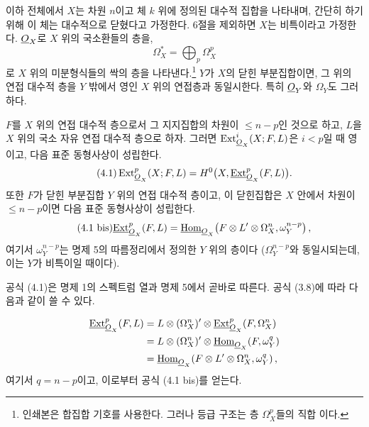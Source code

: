 
이하 전체에서 $X$는 차원 $n$이고 체 $k$ 위에 정의된 대수적 집합을
나타내며, 간단히 하기 위해 이 체는 대수적으로 닫혔다고 가정한다. 6절을
제외하면 $X$는 비특이라고 가정한다. $\underline{O}_X$로 $X$ 위의 국소환들의 층을,
\[
  \Omega_X^{*}=\bigoplus_p\Omega_X^{p}
\]
로 $X$ 위의 미분형식들의 싹의 층을 나타낸다.\footnote{인쇄본은
합집합 기호를 사용한다. 그러나 등급 구조는 층 $\Omega_X^p$들의 직합
이다.} $Y$가 $X$의 닫힌 부분집합이면, 그 위의 연접 대수적 층을
$Y$ 밖에서 영인 $X$ 위의 연접층과 동일시한다. 특히 $\underline{O}_Y$와
$\Omega_Y$도 그러하다.

 $F$를 $X$ 위의 연접 대수적 층으로서 그 지지집합의
차원이 $\leq n-p$인 것으로 하고, $L$을 $X$ 위의 국소 자유 연접 대수적 층으로
하자. 그러면 $\operatorname{Ext}_{\underline{O}_X}^{i}(X;F,L)$은 $i<p$일 때 영이고,
다음 표준 동형사상이 성립한다.
\begin{equation}\tag{4.1}
  \operatorname{Ext}_{\underline{O}_X}^{p}(X;F,L)
  =H^{0}\bigl(X,\underline{\operatorname{Ext}}_{\underline{O}_X}^{p}(F,L)\bigr).
\end{equation}
또한 $F$가 닫힌 부분집합 $Y$ 위의 연접 대수적 층이고, 이 닫힌집합은 $X$ 안에서
차원이 $\leq n-p$이면 다음 표준 동형사상이 성립한다.
\begin{equation}\tag{4.1 bis}
  \underline{\operatorname{Ext}}_{\underline{O}_X}^{p}(F,L)
  =\underline{\operatorname{Hom}}_{\underline{O}_X}\!\left(
    F\otimes L'\otimes\Omega_X^{n},\omega_Y^{n-p}
  \right),
\end{equation}
여기서 $\omega_Y^{n-p}$는 명제 5의 따름정리에서 정의한 $Y$ 위의 층이다
($\Omega_Y^{n-p}$와 동일시되는데, 이는 $Y$가 비특이일 때이다).

공식 (4.1)은 명제 1의 스펙트럼 열과 명제 5에서 곧바로 따른다. 공식
(3.8)에 따라 다음과 같이 쓸 수 있다.

\begin{align*}
\underline{\operatorname{Ext}}_{\underline{O}_X}^{p}(F,L)
&=L\otimes(\Omega_X^{n})'\otimes
  \underline{\operatorname{Ext}}_{\underline{O}_X}^{p}(F,\Omega_X^{n})\\
&=L\otimes(\Omega_X^{n})'\otimes
  \underline{\operatorname{Hom}}_{\underline{O}_X}(F,\omega_Y^{q})\\
&=\underline{\operatorname{Hom}}_{\underline{O}_X}\!\left(
  F\otimes L'\otimes\Omega_X^{n},\omega_Y^{q}\right),
\end{align*}
여기서 $q=n-p$이고, 이로부터 공식 (4.1 bis)를 얻는다.

